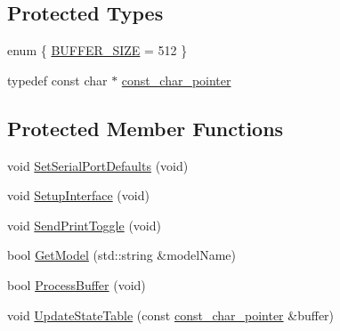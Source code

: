 \subsection*{Protected Types}
\begin{DoxyCompactItemize}
\item 
enum \{ \hyperlink{classmts_sartorius_serial_a14d6fa459e993354125cf4a0d9420000a7a2c0b5e39b999002353c52f30f82d1f}{B\+U\+F\+F\+E\+R\+\_\+\+S\+I\+Z\+E} = 512
 \}
\item 
typedef const char $\ast$ \hyperlink{classmts_sartorius_serial_a84eee50d0f43b06e6adac9ae20f4f02c}{const\+\_\+char\+\_\+pointer}
\end{DoxyCompactItemize}
\subsection*{Protected Member Functions}
\begin{DoxyCompactItemize}
\item 
void \hyperlink{classmts_sartorius_serial_a0acfac7c902913c73619a32f980b0825}{Set\+Serial\+Port\+Defaults} (void)
\item 
void \hyperlink{classmts_sartorius_serial_a9164bd6981785f181d85882d54c1a90b}{Setup\+Interface} (void)
\item 
void \hyperlink{classmts_sartorius_serial_ac2b2bb346c7a268c4520d08233eb514c}{Send\+Print\+Toggle} (void)
\item 
bool \hyperlink{classmts_sartorius_serial_a2538f5214752157e6753650f5a8f5160}{Get\+Model} (std\+::string \&model\+Name)
\item 
bool \hyperlink{classmts_sartorius_serial_a089d5aa3907c5da402baea5f0a8d5d45}{Process\+Buffer} (void)
\item 
void \hyperlink{classmts_sartorius_serial_a34e92243a311de737180ada96905ca40}{Update\+State\+Table} (const \hyperlink{classmts_sartorius_serial_a84eee50d0f43b06e6adac9ae20f4f02c}{const\+\_\+char\+\_\+pointer} \&buffer)
\end{DoxyCompactItemize}
